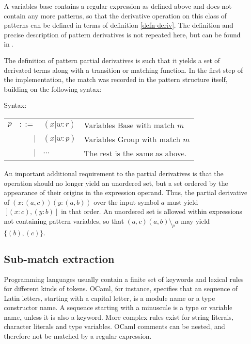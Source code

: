 A variables base contains a regular expression as defined above and does not
contain any more patterns, so that the derivative operation on this class of
patterns can be defined in terms of definition \ref{defn-deriv}. The definition
and precise description of pattern derivatives is not repeated here, but can be
found in \cite{pdpat}.

The definition of pattern partial derivatives is such that it yields a set of
derivated terms along with a transition or matching function. In the first step
of the implementation, the match was recorded in the pattern structure itself,
building on the following syntax:

\begin{defn}
   \label{defn-pat-with-match}
   Syntax:

   \begin{tabular}{lrll}
      $p$	& $::=$	& $(x|w:r)$	& Variables Base  with match $m$	\\
		& $|$	& $(x|w:p)$	& Variables Group with match $m$	\\
		& $|$	& $\dots$	& The rest is the same as above.	\\
   \end{tabular}
\end{defn}

An important additional requirement to the partial derivatives is that the
operation should no longer yield an unordered set, but a set ordered by the
appearance of their origins in the expression operand. Thus, the partial
derivative of $(x:(a,c))(y:(a,b))$ over the input symbol $a$ must yield
$[(x:c),(y:b)]$ in that order. An unordered set is allowed within expressions
not containing pattern variables, so that $(a,c)(a,b) \setminus_p a$ may yield
$\{(b),(c)\}$.

\subsection{Sub-match extraction}

Programming languages usually contain a finite set of keywords and lexical rules
for different kinds of tokens. OCaml, for instance, specifies that an sequence
of Latin letters, starting with a capital letter, is a module name or a type
constructor name. A sequence starting with a minuscule is a type or variable
name, unless it is also a keyword. More complex rules exist for string literals,
character literals and type variables. OCaml comments can be nested, and
therefore not be matched by a regular expression.


